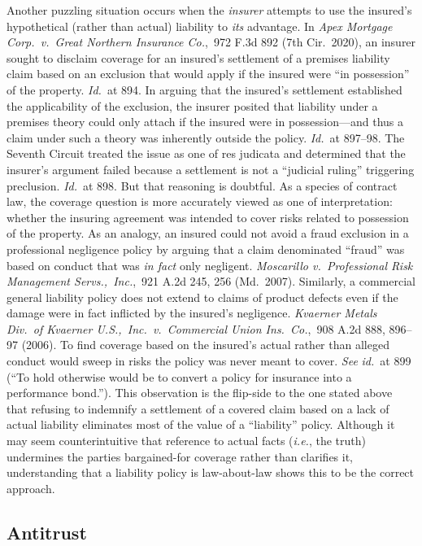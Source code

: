 \documentclass[
  12pt,
  letterpaper,
]{scrartcl}
\begin{document}
Another puzzling situation occurs when the \textit{insurer} attempts to use the insured's hypothetical (rather than actual) liability to \textit{its} advantage.
In \textit{Apex Mortgage
Corp.~v.~Great Northern Insurance Co.},~972 F.3d 892 (7th Cir.~2020), an
insurer sought to disclaim coverage for an insured's settlement of a premises
liability claim based on an exclusion that would apply if the insured were ``in
possession'' of the property. \textit{Id.}~at 894. In arguing that the
insured's settlement established the applicability of the exclusion, the
insurer posited that liability under a premises theory could only attach if the
insured were in possession---and thus a claim under such a theory was
inherently outside the policy. \textit{Id.}~at 897--98. The Seventh Circuit
treated the issue as one of res judicata and determined that the insurer's
argument failed because a settlement is not a ``judicial ruling'' triggering preclusion.
\textit{Id.}~at 898. But that reasoning is doubtful. As a species of contract law, the coverage question is more accurately viewed as one of
interpretation: whether the insuring agreement was intended to cover risks related to
possession of the property. As an analogy, an insured could not avoid a fraud
exclusion in a professional negligence policy by arguing that a claim
denominated ``fraud'' was based on conduct that was \textit{in fact} only
negligent. \textit{Moscarillo v.~Professional Risk Management
Servs.,~Inc.},~921 A.2d 245, 256 (Md.~2007). Similarly, a commercial general
liability policy does not extend to claims of product defects even if the
damage were in fact inflicted by the insured's negligence. \textit{Kvaerner
Metals Div.~of Kvaerner U.S.,~Inc.~v.~Commercial Union Ins.~Co.},~908 A.2d 888,
896--97 (2006). To find coverage based on the insured's actual rather than
alleged conduct would sweep in risks the policy was never meant to cover.
\textit{See} \textit{id.}~at 899 (``To hold otherwise would be to convert a
policy for insurance into a performance bond.''). This observation is the
flip-side to the one stated above that refusing to indemnify a settlement of a
covered claim based on a lack of actual liability eliminates most of the value
of a ``liability'' policy. Although it may seem counterintuitive that reference to actual
facts (\textit{i.e.}, the truth) undermines the parties bargained-for coverage rather than clarifies it,
understanding that a liability policy is law-about-law shows this to be the
correct approach.


\subsection{Antitrust}
\end{document}
